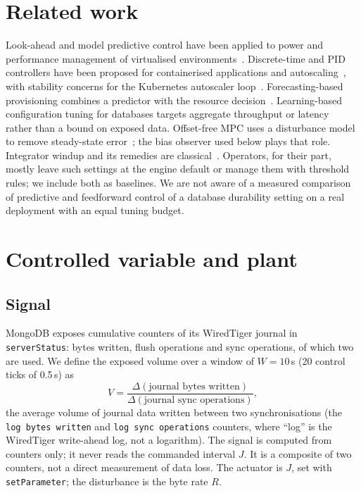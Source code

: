 \documentclass[smallextended]{svjour3}
\begin{document}
\section{Related work}\label{sec:related}
Look-ahead and model predictive control have been applied to power and
performance management of virtualised environments~\cite{kusic2009lookahead,padala2009automated,fang2016qos}.
Discrete-time and PID controllers have been proposed for containerised
applications and autoscaling~\cite{baresi2016discrete,sabuhi2021adaptive,cai2022inverse,pozdniakova2024sla},
with stability concerns for the Kubernetes autoscaler loop~\cite{serracanta2025stability}.
Forecasting-based provisioning combines a predictor with the resource
decision~\cite{roy2011autoscaling,gong2010press,joshi2024arimapid}. Learning-based
configuration tuning for databases targets aggregate throughput or latency~\cite{vanaken2017ottertune,zhang2019cdbtune,ferreira2020selftunable}
rather than a bound on exposed data. Offset-free MPC uses a disturbance model to remove
steady-state error~\cite{muske2002disturbance,pannocchia2003disturbance}; the bias
observer used below plays that role. Integrator windup and its remedies are classical~\cite{astrom1989windup,kothare1994antiwindup}.
Operators, for their part, mostly leave such settings at the engine default or manage them with threshold rules; we include both as baselines. We are not aware of a measured comparison of predictive and feedforward control of a database durability setting
on a real deployment with an equal tuning budget.

\section{Controlled variable and plant}\label{sec:plant}
\subsection{Signal}
MongoDB exposes cumulative counters of its WiredTiger journal in
\texttt{serverStatus}: bytes written, flush operations and sync operations, of which two are used. We define the
exposed volume over a window of $W=10$\,s (20 control ticks of 0.5\,s) as
\begin{equation}
V=\frac{\Delta(\text{journal bytes written})}{\Delta(\text{journal sync operations})},
\end{equation}
the average volume of journal data written between two synchronisations (the \texttt{log bytes written} and \texttt{log sync operations} counters, where ``log'' is the WiredTiger write-ahead log, not a logarithm). The
signal is computed from counters only; it never reads the commanded interval $J$. It is a composite of two counters,
not a direct measurement of data loss. The actuator is $J$, set with
\texttt{setParameter}; the disturbance is the byte rate $R$.
\end{document}
